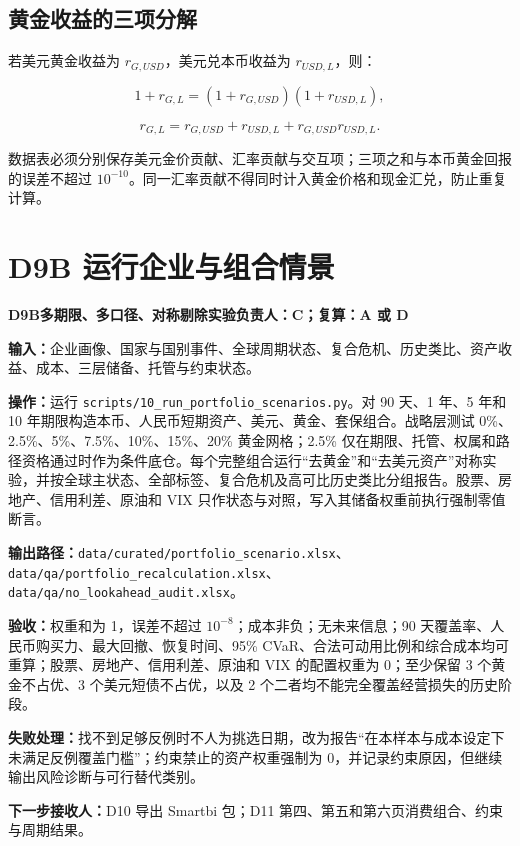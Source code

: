 \documentclass[UTF8,fontset=windows,12pt,openany]{ctexbook}
\newcommand{\File}[1]{{\small\nolinkurl{#1}}}
\newcommand{\StepTitle}[3]{%
  \noindent\colorbox{DeepNavy}{\parbox{0.965\textwidth}{\color{white}\Large\bfseries #1\quad #2\hfill\normalsize #3}}\par\medskip
}
\newcommand{\CardRow}[2]{\noindent\textbf{#1：}#2\par}
\begin{document}
\subsection{黄金收益的三项分解}

若美元黄金收益为 \(r_{G,USD}\)，美元兑本币收益为 \(r_{USD,L}\)，则：

\begin{equation}
1+r_{G,L}=(1+r_{G,USD})(1+r_{USD,L}),
\end{equation}

\begin{equation}
r_{G,L}=r_{G,USD}+r_{USD,L}+r_{G,USD}r_{USD,L}.
\end{equation}

数据表必须分别保存美元金价贡献、汇率贡献与交互项；三项之和与本币黄金回报的误差不超过 \(10^{-10}\)。同一汇率贡献不得同时计入黄金价格和现金汇兑，防止重复计算。

\newpage
\section{D9B 运行企业与组合情景}
\StepTitle{D9B}{多期限、多口径、对称剔除实验}{负责人：C；复算：A 或 D}
\CardRow{输入}{企业画像、国家与国别事件、全球周期状态、复合危机、历史类比、资产收益、成本、三层储备、托管与约束状态。}
\CardRow{操作}{运行 \File{scripts/10_run_portfolio_scenarios.py}。对 90 天、1 年、5 年和 10 年期限构造本币、人民币短期资产、美元、黄金、套保组合。战略层测试 0\%、2.5\%、5\%、7.5\%、10\%、15\%、20\% 黄金网格；2.5\% 仅在期限、托管、权属和路径资格通过时作为条件底仓。每个完整组合运行“去黄金”和“去美元资产”对称实验，并按全球主状态、全部标签、复合危机及高可比历史类比分组报告。股票、房地产、信用利差、原油和 VIX 只作状态与对照，写入其储备权重前执行强制零值断言。}
\CardRow{输出路径}{\File{data/curated/portfolio_scenario.xlsx}、\File{data/qa/portfolio_recalculation.xlsx}、\File{data/qa/no_lookahead_audit.xlsx}。}
\CardRow{验收}{权重和为 1，误差不超过 \(10^{-8}\)；成本非负；无未来信息；90 天覆盖率、人民币购买力、最大回撤、恢复时间、95\% CVaR、合法可动用比例和综合成本均可重算；股票、房地产、信用利差、原油和 VIX 的配置权重为 0；至少保留 3 个黄金不占优、3 个美元短债不占优，以及 2 个二者均不能完全覆盖经营损失的历史阶段。}
\CardRow{失败处理}{找不到足够反例时不人为挑选日期，改为报告“在本样本与成本设定下未满足反例覆盖门槛”；约束禁止的资产权重强制为 0，并记录约束原因，但继续输出风险诊断与可行替代类别。}
\CardRow{下一步接收人}{D10 导出 Smartbi 包；D11 第四、第五和第六页消费组合、约束与周期结果。}
\end{document}
